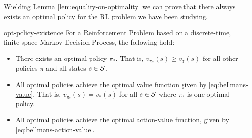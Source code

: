 Wielding Lemma \ref{lem:equality-on-optimality} we can prove that there always
exists an optimal policy for the RL problem we have been studying.

\begin{thrm}{}{opt-policy-existence}
    For a Reinforcement Problem based on a discrete-time, finite-space Markov Decision Process, the following hold:
    \begin{itemize}
        \item There exists an optimal policy $\pi_*$. That is, $v_{\pi_*} (s)
            \geq v_{\pi}(s)$ for all other policies $\pi$ and all states $s \in
            \mathcal{S}$.
        \item All optimal policies achieve the optimal value function given by
            \eqref{eq:bellmans-value}. That is, $v_{\pi_*}(s) = v_* (s)$ for all
            $s \in \mathcal{S}$ where $\pi_*$ is one optimal policy.
        \item All optimal policies achieve the optimal action-value function,
            given by \eqref{eq:bellmans-action-value}.
    \end{itemize}
\end{thrm}

